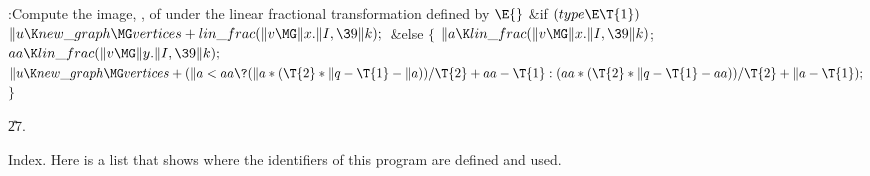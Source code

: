 \Y\B\4:Compute the image, , of  under the linear fractional
transformation defined by \X${}\E{}$\6
\&{if} ${}(\\{type}\E\T{1}){}$\1\5
${}\|u\K\\{new\_graph}\MG\\{vertices}+\\{lin\_frac}(\|v\MG\|x.\|I,\39\|k);{}$\2%
\6
\&{else}\5
${}\{{}$\1\6
${}\|a\K\\{lin\_frac}(\|v\MG\|x.\|I,\39\|k){}$;\5
${}\\{aa}\K\\{lin\_frac}(\|v\MG\|y.\|I,\39\|k);{}$\6
${}\|u\K\\{new\_graph}\MG\\{vertices}+(\|a<\\{aa}\?(\|a*(\T{2}*\|q-\T{1}-\|a))/%
\T{2}+\\{aa}-\T{1}:(\\{aa}*(\T{2}*\|q-\T{1}-\\{aa}))/\T{2}+\|a-\T{1});{}$\6
\4${}\}{}$\2\par
\U27.\fi

Index. Here is a list that shows where the identifiers of this program
are
defined and used.
\fi

\inx
\fin
\con
